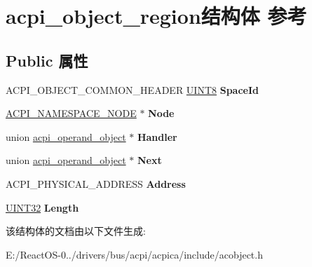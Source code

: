 \hypertarget{structacpi__object__region}{}\section{acpi\+\_\+object\+\_\+region结构体 参考}
\label{structacpi__object__region}
\subsection*{Public 属性}
\begin{DoxyCompactItemize}
\item 
\mbox{\label{structacpi__object__region_a6a83ecded0272904ff2433aee63a83d3}} 
A\+C\+P\+I\+\_\+\+O\+B\+J\+E\+C\+T\+\_\+\+C\+O\+M\+M\+O\+N\+\_\+\+H\+E\+A\+D\+ER \hyperlink{_processor_bind_8h_ab27e9918b538ce9d8ca692479b375b6a}{U\+I\+N\+T8} {\bfseries Space\+Id}
\item 
\mbox{\label{structacpi__object__region_a1008105716fe531fa53e0481f92ad34a}} 
\hyperlink{structacpi__namespace__node}{A\+C\+P\+I\+\_\+\+N\+A\+M\+E\+S\+P\+A\+C\+E\+\_\+\+N\+O\+DE} $\ast$ {\bfseries Node}
\item 
\mbox{\label{structacpi__object__region_a989c759360c849aab4bfd29c88c11da8}} 
union \hyperlink{unionacpi__operand__object}{acpi\+\_\+operand\+\_\+object} $\ast$ {\bfseries Handler}
\item 
\mbox{\label{structacpi__object__region_abef7b66e6296419d89396d319658f6ed}} 
union \hyperlink{unionacpi__operand__object}{acpi\+\_\+operand\+\_\+object} $\ast$ {\bfseries Next}
\item 
\mbox{\label{structacpi__object__region_a7c86ffb4b5843aa03a85436792db4144}} 
A\+C\+P\+I\+\_\+\+P\+H\+Y\+S\+I\+C\+A\+L\+\_\+\+A\+D\+D\+R\+E\+SS {\bfseries Address}
\item 
\mbox{\label{structacpi__object__region_a8937d7903133bde80c9c6d23e9b1b3c2}} 
\hyperlink{_processor_bind_8h_ae1e6edbbc26d6fbc71a90190d0266018}{U\+I\+N\+T32} {\bfseries Length}
\end{DoxyCompactItemize}


该结构体的文档由以下文件生成\+:\begin{DoxyCompactItemize}
\item 
E\+:/\+React\+O\+S-\/0../drivers/bus/acpi/acpica/include/acobject.\+h\end{DoxyCompactItemize}

